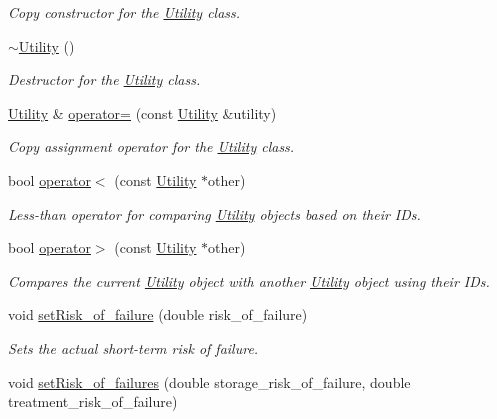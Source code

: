 \begin{DoxyCompactItemize}
\begin{DoxyCompactList}\small\item\em Copy constructor for the \mbox{\hyperlink{classUtility}{Utility}} class. \end{DoxyCompactList}\item 
\mbox{\hyperlink{classUtility_aecfe4b31e39b00555158a2d8288b874a}{$\sim$\+Utility}} ()
\begin{DoxyCompactList}\small\item\em Destructor for the \mbox{\hyperlink{classUtility}{Utility}} class. \end{DoxyCompactList}\item 
\mbox{\hyperlink{classUtility}{Utility}} \& \mbox{\hyperlink{classUtility_a9a362d68a5aa3ec934c286f3a7e9b721}{operator=}} (const \mbox{\hyperlink{classUtility}{Utility}} \&utility)
\begin{DoxyCompactList}\small\item\em Copy assignment operator for the \mbox{\hyperlink{classUtility}{Utility}} class. \end{DoxyCompactList}\item 
bool \mbox{\hyperlink{classUtility_ae2dad8029e34c5bb073a5ddf4381d278}{operator$<$}} (const \mbox{\hyperlink{classUtility}{Utility}} $\ast$other)
\begin{DoxyCompactList}\small\item\em Less-\/than operator for comparing \mbox{\hyperlink{classUtility}{Utility}} objects based on their I\+Ds. \end{DoxyCompactList}\item 
bool \mbox{\hyperlink{classUtility_a222897e8c338fde0d754df4683fbc89b}{operator$>$}} (const \mbox{\hyperlink{classUtility}{Utility}} $\ast$other)
\begin{DoxyCompactList}\small\item\em Compares the current \mbox{\hyperlink{classUtility}{Utility}} object with another \mbox{\hyperlink{classUtility}{Utility}} object using their I\+Ds. \end{DoxyCompactList}\item 
void \mbox{\hyperlink{classUtility_a68d5088951f6bdccbb7af18ea8f153f5}{set\+Risk\+\_\+of\+\_\+failure}} (double risk\+\_\+of\+\_\+failure)
\begin{DoxyCompactList}\small\item\em Sets the actual short-\/term risk of failure. \end{DoxyCompactList}\item 
void \mbox{\hyperlink{classUtility_aadf42161486c8305b0b55aa65c5f519e}{set\+Risk\+\_\+of\+\_\+failures}} (double storage\+\_\+risk\+\_\+of\+\_\+failure, double treatment\+\_\+risk\+\_\+of\+\_\+failure)

\end{DoxyCompactItemize}
